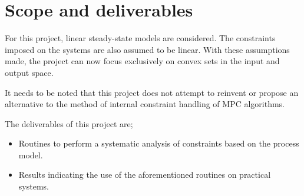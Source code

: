 \section{Scope and deliverables}
For this project, linear steady-state models are considered.
The constraints imposed on the systems are also assumed to be linear.
With these assumptions made, the project can now focus exclusively on convex sets in the input and output space.

It needs to be noted that this project does not attempt to reinvent or propose an alternative to the method of internal constraint handling of MPC algorithms.

The deliverables of this project are;
\begin{itemize}
\item Routines to perform a systematic analysis of constraints based on the process model.
\item Results indicating the use of the aforementioned routines on practical systems.
\end{itemize}

